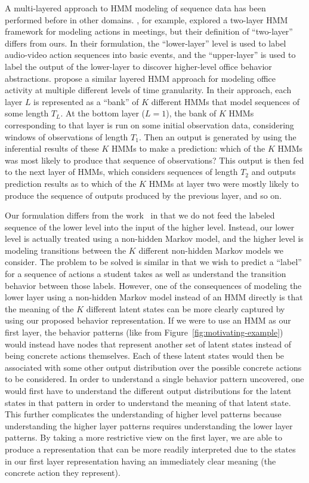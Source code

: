 A multi-layered approach to HMM modeling of sequence data has been
performed before in other domains. \citet{Zhang:2004:CVPR}, for example,
explored a two-layer HMM framework for modeling actions in meetings, but
their definition of ``two-layer'' differs from ours. In their formulation,
the ``lower-layer'' level is used to label audio-video action sequences
into basic events, and the ``upper-layer'' is used to label the output of
the lower-layer to discover higher-level office behavior abstractions.
\citet{Oliver:2004:CVIU} propose a similar layered HMM approach
for modeling office activity at multiple different levels of time
granularity. In their approach, each layer $L$ is represented as a ``bank''
of $K$ different HMMs that model sequences of some length $T_L$. At the
bottom layer ($L = 1$), the bank of $K$ HMMs corresponding to that layer is
run on some initial observation data, considering windows of observations
of length $T_1$. Then an output is generated by using the inferential
results of these $K$ HMMs to make a prediction: which of the $K$ HMMs was
most likely to produce that sequence of observations? This output is then
fed to the next layer of HMMs, which considers sequences of length $T_2$
and outputs prediction results as to which of the $K$ HMMs at layer two
were mostly likely to produce the sequence of outputs produced by the
previous layer, and so on.

Our formulation differs from the work~\cite{Zhang:2004:CVPR,Oliver:2004:CVIU} in that we do not feed the labeled
sequence of the lower level into the input of the higher level. Instead,
our lower level is actually treated using a non-hidden Markov model, and
the higher level is modeling transitions between the $K$ different
non-hidden Markov models we consider. The problem to be solved is similar
in that we wish to predict a ``label'' for a sequence of actions a student
takes as well as understand the transition behavior between those labels.
However, one of the consequences of modeling the lower layer using a
non-hidden Markov model instead of an HMM directly is that the meaning of
the $K$ different latent states can be more clearly captured by using our
proposed behavior representation. If we were to use an HMM as our first
layer, the behavior patterns (like from
Figure~\ref{fig:motivating-example}) would instead have nodes that
represent another set of latent states instead of being concrete actions
themselves. Each of these latent states would then be associated with some
other output distribution over the possible concrete actions to be
considered. In order to understand a single behavior pattern uncovered, one
would first have to understand the different output distributions for the
latent states in that pattern in order to understand the meaning of that
latent state. This further complicates the understanding of higher level
patterns because understanding the higher layer patterns requires
understanding the lower layer patterns. By taking a more restrictive view
on the first layer, we are able to produce a representation that can be
more readily interpreted due to the states in our first layer
representation having an immediately clear meaning (the concrete action
they represent).

